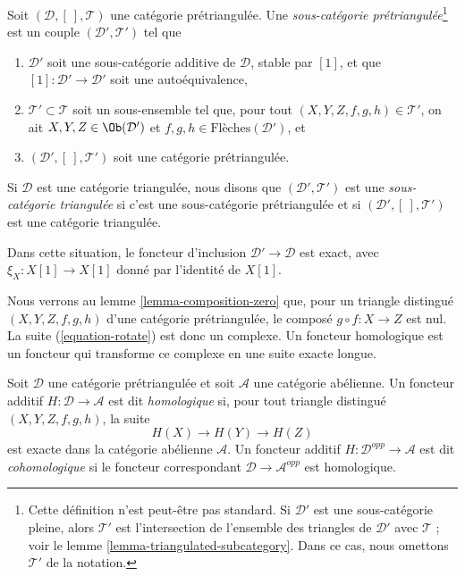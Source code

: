 \begin{definition}
\label{definition-triangulated-subcategory}
Soit $(\mathcal{D}, [\ ], \mathcal{T})$ une catégorie prétriangulée.
Une {\it sous-catégorie prétriangulée}\footnote{Cette définition n'est
peut-être pas standard. Si $\mathcal{D}'$ est une sous-catégorie pleine, alors
$\mathcal{T}'$ est l'intersection de l'ensemble des triangles de
$\mathcal{D}'$ avec $\mathcal{T}$ ; voir le
lemme \ref{lemma-triangulated-subcategory}. Dans ce cas, nous omettons
$\mathcal{T}'$ de la notation.}
est un couple $(\mathcal{D}', \mathcal{T}')$ tel que
\begin{enumerate}
\item $\mathcal{D}'$ soit une sous-catégorie additive de $\mathcal{D}$,
stable par $[1]$, et que $[1] : \mathcal{D}' \to \mathcal{D}'$ soit une
autoéquivalence,
\item $\mathcal{T}' \subset \mathcal{T}$ soit un sous-ensemble tel que, pour
tout $(X, Y, Z, f, g, h) \in \mathcal{T}'$, on ait
$X, Y, Z \in \Ob(\mathcal{D}')$ et
$f, g, h \in \text{Flèches}(\mathcal{D}')$, et
\item $(\mathcal{D}', [\ ], \mathcal{T}')$ soit une catégorie prétriangulée.
\end{enumerate}
Si $\mathcal{D}$ est une catégorie triangulée, nous disons que
$(\mathcal{D}', \mathcal{T}')$ est une {\it sous-catégorie triangulée} si
c'est une sous-catégorie prétriangulée et si
$(\mathcal{D}', [\ ], \mathcal{T}')$ est une catégorie triangulée.
\end{definition}

\noindent
Dans cette situation, le foncteur d'inclusion
$\mathcal{D}' \to \mathcal{D}$ est exact, avec
$\xi_X : X[1] \to X[1]$ donné par l'identité de $X[1]$.

\medskip\noindent
Nous verrons au lemme \ref{lemma-composition-zero} que, pour un triangle
distingué $(X, Y, Z, f, g, h)$ d'une catégorie prétriangulée, le composé
$g \circ f : X \to Z$ est nul. La suite (\ref{equation-rotate}) est donc un
complexe. Un foncteur homologique est un foncteur qui transforme ce complexe
en une suite exacte longue.

\begin{definition}
\label{definition-homological}
Soit $\mathcal{D}$ une catégorie prétriangulée et soit $\mathcal{A}$ une
catégorie abélienne. Un foncteur additif $H : \mathcal{D} \to \mathcal{A}$
est dit {\it homologique} si, pour tout triangle distingué
$(X, Y, Z, f, g, h)$, la suite
$$
H(X) \to H(Y) \to H(Z)
$$
est exacte dans la catégorie abélienne $\mathcal{A}$. Un foncteur additif
$H : \mathcal{D}^{opp} \to \mathcal{A}$ est dit {\it cohomologique} si le
foncteur correspondant $\mathcal{D} \to \mathcal{A}^{opp}$ est homologique.
\end{definition}

